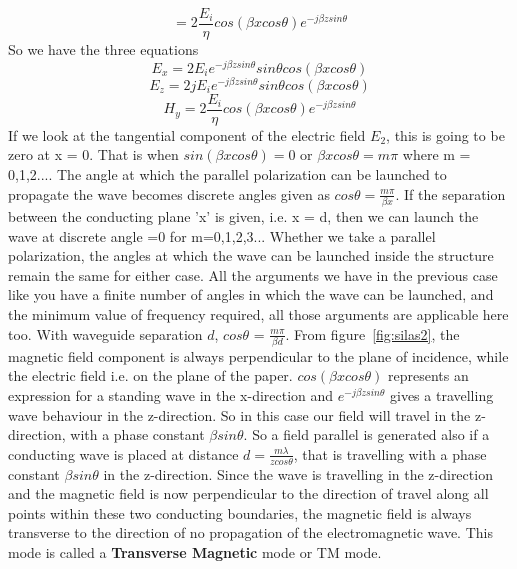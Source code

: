 \begin{equation*}
= 2\frac{E_{i}}{\eta} cos(\beta xcos\theta)e^{-j\beta zsin\theta}
\end{equation*}
So we have the three equations
\begin{equation}
E_x = 2 E_{i} e^{-j\beta zsin\theta} sin\theta cos(\beta xcos\theta)
\label{eqn:field1}
\end{equation}
\begin{equation}
E_z = 2 jE_{i} e^{-j\beta zsin\theta} sin\theta cos(\beta xcos\theta)
\label{eqn:field2}
\end{equation}
\begin{equation}
H_y = 2 \frac{E_{i}}{\eta} cos(\beta xcos\theta) e^{-j\beta zsin\theta} 
\label{eqn:field3}
\end{equation}
If we look at the tangential component of the electric field $E_{2}$, this is going to be zero at x = 0. That is when $sin(\beta xcos\theta) =0$ or $\beta xcos\theta = m\pi$ where m = 0,1,2.... The angle at which the parallel polarization can be launched to propagate the wave becomes discrete angles given as $cos\theta = \frac{m\pi}{\beta x}$. If the separation between the conducting plane 'x' is given, i.e. x = d, then we can launch the wave at discrete angle =0 for m=0,1,2,3... Whether we take a parallel polarization, the angles at which the wave can be launched inside the structure remain the same for either case. All the arguments we have in the previous case like you have a finite number of angles in which the wave can be launched, and the minimum value of frequency required, all those arguments are applicable here too. With waveguide separation $d$, $cos\theta$ = $\frac{m\pi}{\beta d}$.
From figure~\ref{fig:silas2}, the magnetic field component is always perpendicular to the plane of incidence, while the electric field i.e. on the plane of the paper. $cos(\beta xcos\theta)$ represents an expression for a standing wave in the x-direction and $e^{-j\beta zsin\theta}$ gives a travelling wave behaviour in the z-direction. So in this case our field will travel in the z-direction, with a phase constant $\beta sin\theta$. So a field parallel is generated also if a conducting wave is placed at distance $d= \frac{m\lambda}{z cos\theta}$, that is travelling with a phase constant $\beta sin\theta$ in the z-direction. Since the wave is travelling in the z-direction and the magnetic field is now perpendicular to the direction of travel along all points within these two conducting boundaries, the magnetic field is always transverse to the direction of no propagation of the electromagnetic wave. This mode is called a \textbf{Transverse Magnetic} mode or TM mode.

